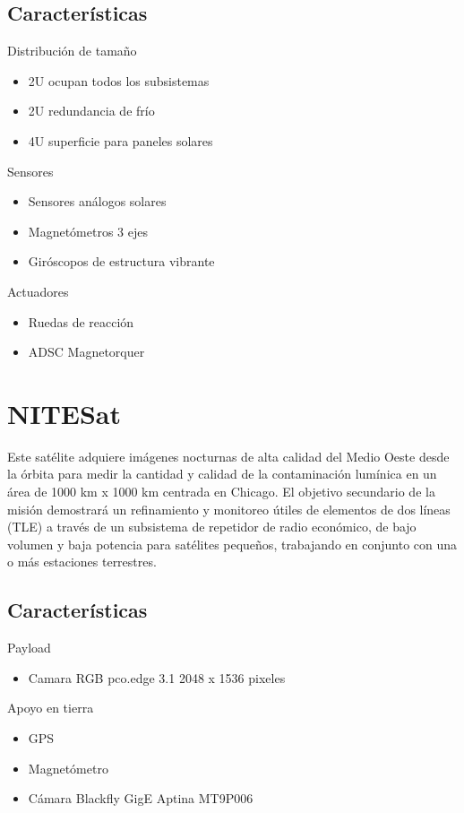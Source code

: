 \documentclass[12pt]{extarticle}
\begin{document}
\subsection{Características}
Distribución de tamaño 
\begin{itemize}
\item 2U ocupan todos los subsistemas
\item 2U redundancia de frío 
\item 4U superficie para paneles solares    
\end{itemize}

Sensores
\begin{itemize}
\item Sensores análogos solares
\item Magnetómetros 3 ejes 
\item Giróscopos de estructura vibrante
\end{itemize}

Actuadores
\begin{itemize}
\item Ruedas de reacción
\item ADSC Magnetorquer
\end{itemize}

\section{NITESat}

Este satélite adquiere imágenes nocturnas de alta calidad del Medio Oeste desde la órbita para medir la cantidad y calidad de la contaminación lumínica en un área de 1000 km x 1000 km centrada en Chicago. El objetivo secundario de la misión demostrará un refinamiento y monitoreo útiles de elementos de dos líneas (TLE) a través de un subsistema de repetidor de radio económico, de bajo volumen y baja potencia para satélites pequeños, trabajando en conjunto con una o más estaciones terrestres.

\subsection{Características}
Payload
\begin{itemize}
    \item Camara RGB pco.edge 3.1 2048 x 1536 pixeles 
\end{itemize}

Apoyo en tierra

\begin{itemize}
    \item GPS
    \item Magnetómetro
    \item Cámara  Blackfly GigE Aptina MT9P006
\end{itemize}
\end{document}
